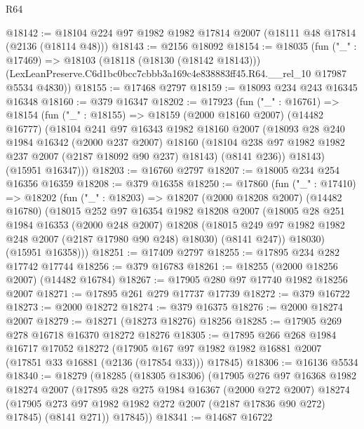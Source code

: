 \begin{lexlean}{R64}
\begin{coremodule}
@18142 := @18104 @224 @97 @1982 @1982 @17814 @2007 (@18111 @48 @17814 (@2136 (@18114 @48)))
@18143 := @2156 @18092
@18154 := @18035
    (fun ("_" : @17469) =>
    @18103
      (@18118 (@18130 (@18142 @18143)))
      (LexLeanPreserve.C6d1bc0bcc7cbbb3a169c4e838883ff45.R64.__rel_10 @17987 @5534 @4830))
@18155 := @17468 @2797
@18159 := @18093 @234 @243 @16345 @16348
@18160 := @379 @16347
@18202 := @17923
    (fun ("_" : @16761) =>
    @18154
      (fun ("_" : @18155) =>
      @18159
        (@2000 @18160 @2007)
        (@14482 @16777)
        (@18104
          @241
          @97
          @16343
          @1982
          @18160
          @2007
          (@18093
            @28
            @240
            @1984
            @16342
            (@2000 @237 @2007)
            @18160
            (@18104 @238 @97 @1982 @1982 @237 @2007 (@2187 @18092 @90 @237) @18143)
            (@8141 @236))
          @18143)
        (@15951 @16347)))
@18203 := @16760 @2797
@18207 := @18005 @234 @254 @16356 @16359
@18208 := @379 @16358
@18250 := @17860
    (fun ("_" : @17410) =>
    @18202
      (fun ("_" : @18203) =>
      @18207
        (@2000 @18208 @2007)
        (@14482 @16780)
        (@18015
          @252
          @97
          @16354
          @1982
          @18208
          @2007
          (@18005
            @28
            @251
            @1984
            @16353
            (@2000 @248 @2007)
            @18208
            (@18015 @249 @97 @1982 @1982 @248 @2007 (@2187 @17980 @90 @248) @18030)
            (@8141 @247))
          @18030)
        (@15951 @16358)))
@18251 := @17409 @2797
@18255 := @17895 @234 @282 @17742 @17744
@18256 := @379 @16783
@18261 := @18255 (@2000 @18256 @2007) (@14482 @16784)
@18267 := @17905 @280 @97 @17740 @1982 @18256 @2007
@18271 := @17895 @261 @279 @17737 @17739
@18272 := @379 @16722
@18273 := @2000 @18272
@18274 := @379 @16375
@18276 := @2000 @18274 @2007
@18279 := @18271 (@18273 @18276) @18256
@18285 := @17905 @269 @278 @16718 @16370 @18272 @18276
@18305 := @17895
    @266
    @268
    @1984
    @16717
    @17052
    @18272
    (@17905 @167 @97 @1982 @1982 @16881 @2007 (@17851 @33 @16881 (@2136 (@17854 @33))) @17845)
@18306 := @16136 @5534
@18340 := @18279
    (@18285
      (@18305 @18306)
      (@17905
        @276
        @97
        @16368
        @1982
        @18274
        @2007
        (@17895
          @28
          @275
          @1984
          @16367
          (@2000 @272 @2007)
          @18274
          (@17905 @273 @97 @1982 @1982 @272 @2007 (@2187 @17836 @90 @272) @17845)
          (@8141 @271))
        @17845))
@18341 := @14687 @16722

\end{coremodule}
\end{lexlean}
